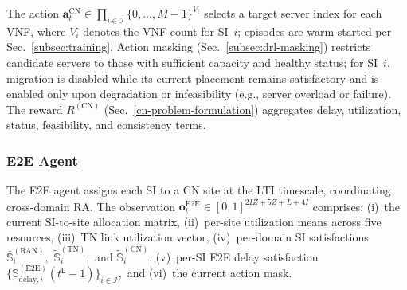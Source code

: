 \documentclass[12pt,lettersize,journal,onecolumn]{IEEEtran}
\begin{document}
The action $\mathbf{a}^{\text{CN}}_t \in \prod_{i\in\mathcal{I}} \{0,\ldots,M-1\}^{V_{i}}$ selects a target server index for each VNF, where $V_{i}$ denotes the VNF count for SI~$i$; episodes are warm-started per Sec.~\ref{subsec:training}. Action masking (Sec.~\ref{subsec:drl-masking}) restricts candidate servers to those with sufficient capacity and healthy status; for SI~$i$, migration is disabled while its current placement remains satisfactory and is enabled only upon degradation or infeasibility (e.g., server overload or failure). The reward $R^{\mathrm{(CN)}}$ (Sec.~\ref{cn-problem-formulation}) aggregates delay, utilization, status, feasibility, and consistency terms.

\subsubsection{\underline{E2E Agent}} \label{subsubsec:pomdp-e2e}
The E2E agent assigns each SI to a CN site at the LTI timescale, coordinating cross-domain RA. The observation $\mathbf{o}^{\text{E2E}}_t \in [0,1]^{2IZ + 5Z + L + 4I}$ comprises: (i)~the current SI-to-site allocation matrix, (ii)~per-site utilization means across five resources, (iii)~TN link utilization vector, (iv)~per-domain SI satisfactions $\bar{\mathbb{S}}^{\mathrm{(RAN)}}_i,$  $\tilde{\mathbb{S}}^{\mathrm{(TN)}}_i,$ and $\tilde{\mathbb{S}}^{\mathrm{(CN)}}_i$, (v)~per-SI E2E delay satisfaction $\bigl\{\mathbb{S}^{\mathrm{(E2E)}}_{\mathrm{delay},i}(t^\mathsf{L}-1)\bigr\}_{i\in\mathcal{I}},$ and (vi)~the current action mask. %
\end{document}
